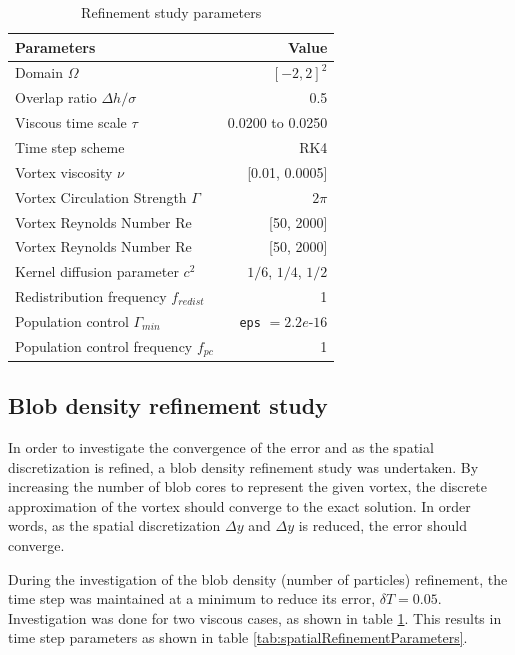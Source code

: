 \begin{table}[hbt]
\centering
	\begin{tabular}{|l|r|}
	\hline \textbf{Parameters} 					& \textbf{Value} \\
	\hline Domain $\Omega$ 						& $[-2, 2]^2$ \\
	Overlap ratio $\Delta h/\sigma$  	& 0.5  \\ 
	Viscous time scale $\tau$ 			& 0.0200 to 0.0250 \\
	Time step scheme 					& RK4 \\
	Vortex viscosity $\nu$ 				& [0.01, 0.0005] \\
	Vortex Circulation Strength $\Gamma$ & $2 \pi$ \\
	Vortex Reynolds Number Re 			& [50, 2000] \\
	Vortex Reynolds Number Re 			& [50, 2000] \\
	Kernel diffusion parameter $c^2$		& $1/6$, $1/4$, $1/2$ \\
	Redistribution frequency $f_{redist}$& 1 \\
	Population control $\Gamma_{min}$ 	& \texttt{eps} $ = 2.2e$\textrm{-}$16$\\
	Population control frequency $f_{pc}$& 1 \\
	\hline 
	\end{tabular} 
\caption{Refinement study parameters}
\label{tab:refinementParameters}
\end{table}


\subsection{Blob density refinement study}
In order to investigate the convergence of the error and as the spatial discretization is refined, a blob density refinement study was undertaken. By increasing the number of blob cores to represent the given vortex, the discrete approximation of the vortex should converge to the exact solution. In order words, as the spatial discretization $\Delta y$ and $\Delta y$ is reduced, the error should converge.

During the investigation of the blob density (number of particles) refinement, the time step was maintained at a minimum to reduce its error, $\delta T = 0.05$. Investigation was done for two viscous cases, as shown in table \ref{tab:refinementParameters}. This results in time step parameters as shown in table \ref{tab:spatialRefinementParameters}.

